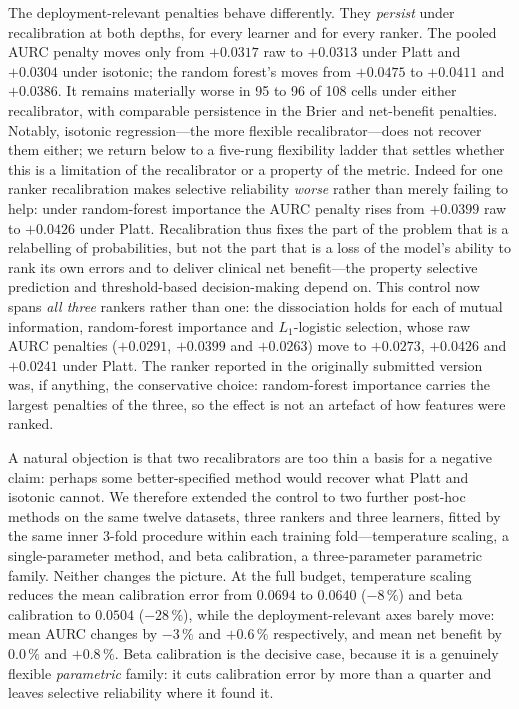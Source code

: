 \documentclass[fleqn,10pt]{wlscirep}
\newcommand{\result}[1]{#1}
\begin{document}
The deployment-relevant penalties behave differently. They \emph{persist} under recalibration at
both depths, for every learner and for every ranker. The pooled AURC penalty moves only from
\result{$+0.0317$} raw to \result{$+0.0313$} under Platt and \result{$+0.0304$} under isotonic; the
random forest's moves from \result{$+0.0475$} to \result{$+0.0411$} and \result{$+0.0386$}. It remains
materially worse in \result{95} to \result{96} of \result{108} cells under either recalibrator, with
comparable persistence in the Brier and net-benefit penalties. Notably,
isotonic regression---the more flexible recalibrator---does not recover them either; we return below to
a five-rung flexibility ladder that settles whether this is a limitation of the recalibrator or a
property of the metric. Indeed for one ranker
recalibration makes selective reliability \emph{worse} rather than merely failing to help: under
random-forest importance the AURC penalty rises from \result{$+0.0399$} raw to \result{$+0.0426$}
under Platt. Recalibration thus fixes the part of the problem that is a
relabelling of probabilities, but not the part that is a loss of the model's ability to rank its own
errors and to deliver clinical net benefit---the property selective prediction and threshold-based
decision-making depend on. This control now spans \emph{all three} rankers rather than one: the
dissociation holds for each of mutual information, random-forest importance and $L_1$-logistic
selection, whose raw AURC penalties (\result{$+0.0291$}, \result{$+0.0399$} and \result{$+0.0263$})
move to \result{$+0.0273$}, \result{$+0.0426$} and \result{$+0.0241$} under Platt. The ranker reported
in the originally submitted version was, if anything, the conservative choice: random-forest
importance carries the largest penalties of the three, so the effect is not an artefact of how
features were ranked.

A natural objection is that two recalibrators are too thin a basis for a negative claim: perhaps some
better-specified method would recover what Platt and isotonic cannot. We therefore extended the control
to two further post-hoc methods on the same twelve datasets, three rankers and three learners, fitted
by the same inner 3-fold procedure within each training fold---temperature scaling, a single-parameter
method, and beta calibration, a three-parameter parametric family. Neither changes the picture. At the
full budget, temperature scaling reduces the mean calibration error from \result{$0.0694$} to
\result{$0.0640$} (\result{$-8\,\%$}) and beta calibration to \result{$0.0504$} (\result{$-28\,\%$}),
while the deployment-relevant axes barely move: mean AURC changes by \result{$-3\,\%$} and
\result{$+0.6\,\%$} respectively, and mean net benefit by \result{$0.0\,\%$} and \result{$+0.8\,\%$}.
Beta calibration is the decisive case, because it is a genuinely flexible \emph{parametric} family: it
cuts calibration error by more than a quarter and leaves selective reliability where it found it.
\end{document}

